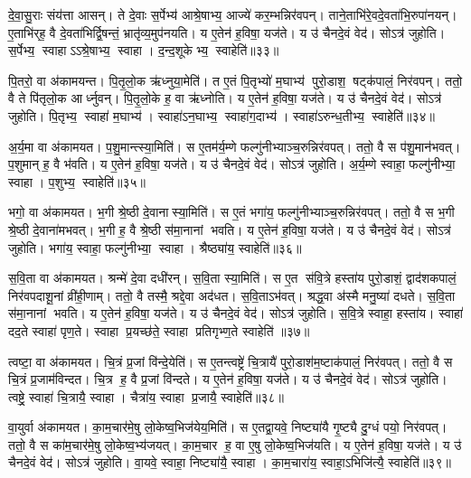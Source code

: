 दे॒वा॒सु॒राः संय॑त्ता आसन्।
ते दे॒वाः स॒र्पेभ्य॑ आश्रे॒षाभ्य॒ आज्ये॑ कर॒म्भन्निर॑वपन्।
ताने॒ताभि॑रे॒वदे॒वता॑भि॒रुपा॑नयन्।
ए॒ताभि॑र्‌ह॒ वै दे॒वता॑भिर्द्वि॒षन्तं॒ भ्रातृ॑व्य॒मुप॑नयति।
य ए॒तेन॑ ह॒विषा॒ यज॑ते।
य उ॑ चैनदे॒वं वेद॑।
सोऽत्र॑ जुहोति।
स॒र्पेभ्य॒ स्वाहाऽऽश्रे॒षाभ्य॒ स्वाहा।
द॒न्द॒शूकेभ्य॒ स्वाहेति॑॥३३॥

पि॒तरो॒ वा अ॑कामयन्त।
पि॒तृ॒लो॒क ऋ॑ध्नुया॒मेति॑।
त ए॒तं पि॒तृभ्यो॑ म॒घाभ्य॑ पुरो॒डाश॒ षट्क॑पालं॒ निर॑वपन्।
ततो॒ वै ते पि॑तृलो॒क आर्ध्नुवन्।
पि॒तृ॒लो॒के ह॒ वा ऋ॑ध्नोति।
य ए॒तेन॑ ह॒विषा॒ यज॑ते।
य उ॑ चैनदे॒वं वेद॑।
सोऽत्र॑ जुहोति।
पि॒तृभ्य॒ स्वाहा॑ म॒घाभ्य॑।
स्वाहा॑ऽन॒घाभ्य॒ स्वाहा॑ग॒दाभ्य॑।
स्वाहा॑ऽरुन्ध॒तीभ्य॒ स्वाहेति॑॥३४॥

अ॒र्य॒मा वा अ॑कामयत।
प॒शु॒मान्त्स्या॒मिति॑।
स ए॒तम॑र्य॒म्णे फल्गु॑नीभ्याञ्च॒रुन्निर॑वपत्।
ततो॒ वै स प॑शु॒मान॑भवत्।
प॒शुमान् ह॒ वै भ॑वति।
य ए॒तेन॑ ह॒विषा॒ यज॑ते।
य उ॑ चैनदे॒वं वेद॑।
सोऽत्र॑ जुहोति।
अ॒र्य॒म्णे स्वाहा॒ फल्गु॑नीभ्या॒ स्वाहा।
प॒शुभ्य॒ स्वाहेति॑॥३५॥

भगो॒ वा अ॑कामयत।
भ॒गी श्रे॒ष्ठी दे॒वानास्या॒मिति॑।
स ए॒तं भगा॑य॒ फल्गु॑नीभ्याञ्च॒रुन्निर॑वपत्।
ततो॒ वै स भ॒गी श्रे॒ष्ठी दे॒वाना॑मभवत्।
भ॒गी ह॒ वै श्रे॒ष्ठी स॑मा॒नानां भवति।
य ए॒तेन॑ ह॒विषा॒ यज॑ते।
य उ॑ चैनदे॒वं वेद॑।
सोऽत्र॑ जुहोति।
भगा॑य॒ स्वाहा॒ फल्गु॑नीभ्या॒ स्वाहा।
श्रैष्ठ्या॑य॒ स्वाहेति॑॥३६॥

स॒वि॒ता वा अ॑कामयत।
श्रन्मे॑ दे॒वा दधी॑रन्।
स॒वि॒ता स्या॒मिति॑।
स ए॒त स॑वि॒त्रे हस्ता॑य पुरो॒डाशं॒ द्वाद॑शकपालं॒ निर॑वपदाशू॒नां व्री॑ही॒णाम्।
ततो॒ वै तस्मै॒ श्रद्दे॒वा अद॑धत।
स॒वि॒ताऽभ॑वत्।
श्रद्ध॒वा अ॑स्मै मनु॒ष्या॑ दधते।
स॒वि॒ता स॑मा॒नानां भवति।
य ए॒तेन॑ ह॒विषा॒ यज॑ते।
य उ॑ चैनदे॒वं वेद॑।
सोऽत्र॑ जुहोति।
स॒वि॒त्रे स्वाहा॒ हस्ता॑य।
स्वाहा॑ दद॒ते स्वाहा॑ पृण॒ते।
स्वाहा प्र॒यच्छ॑ते॒ स्वाहा प्रतिगृभ्ण॒ते स्वाहेति॑ ॥३७॥

त्वष्टा॒ वा अ॑कामयत।
चि॒त्रं प्र॒जां वि॑न्दे॒येति॑।
स ए॒तन्त्वष्ट्रे॑ चि॒त्रायै॑ पुरो॒डाश॑म॒ष्टाक॑पालं॒ निर॑वपत्।
ततो॒ वै स चि॒त्रं प्र॒जाम॑विन्दत।
चि॒त्र ह॒ वै प्र॒जां वि॑न्दते।
य ए॒तेन॑ ह॒विषा॒ यज॑ते।
य उ॑ चैनदे॒वं वेद॑।
सोऽत्र॑ जुहोति।
त्वष्ट्रे॒ स्वाहा॑ चि॒त्रायै॒ स्वाहा।
चैत्रा॑य॒ स्वाहा प्र॒जायै॒ स्वाहेति॑॥३८॥

वा॒युर्वा अ॑कामयत।
का॒म॒चार॑मे॒षु लो॒केष्व॒भिज॑येय॒मिति॑।
स ए॒तद्वा॒यवे॒ निष्ट्या॑यै गृ॒ष्ट्यै दु॒ग्धं पयो॒ निर॑वपत्।
ततो॒ वै स का॑म॒चार॑मे॒षु लो॒केष्व॒भ्य॑जयत्।
का॒म॒चार ह॒ वा ए॒षु लो॒केष्व॒भिज॑यति।
य ए॒तेन॑ ह॒विषा॒ यज॑ते।
य उ॑ चैनदे॒वं वेद॑।
सोऽत्र॑ जुहोति।
वा॒यवे॒ स्वाहा॒ निष्ट्या॑यै॒ स्वाहा।
का॒म॒चारा॑य॒ स्वाहा॒ऽभिजि॑त्यै॒ स्वाहेति॑॥३९॥

